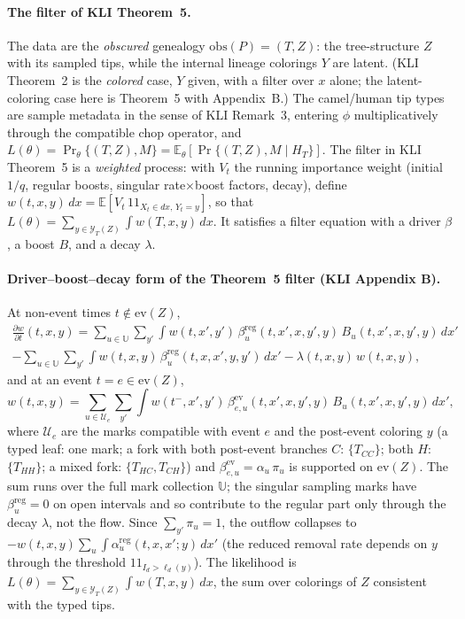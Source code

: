 \documentclass[11pt]{article}
\newcommand{\E}{\mathbb{E}}
\newcommand{\evZ}{\mathrm{ev}(Z)}
\newcommand{\ind}{1\!\!1}
\theoremstyle{plain}
\begin{document}
\paragraph{The filter of KLI Theorem~5.} The data are the \emph{obscured} genealogy
$\mathrm{obs}(P)=(T,Z)$: the tree-structure $Z$ with its sampled tips, while the internal lineage
colorings $Y$ are latent. (KLI Theorem~2 is the \emph{colored} case, $Y$ given, with a filter over
$x$ alone; the latent-coloring case here is Theorem~5 with Appendix~B.) The camel/human tip types
are sample metadata in the sense of KLI Remark~3, entering $\phi$ multiplicatively through the
compatible chop operator, and $L(\theta)=\Pr_\theta\{(T,Z),M\}=\E_\theta[\Pr\{(T,Z),M\mid H_T\}]$. The filter in KLI Theorem~5 is a \emph{weighted} process: with $V_t$ the running importance weight (initial $1/q$, regular
boosts, singular rate$\times$boost factors, decay), define
$w(t,x,y)\,dx=\E\!\left[V_t\,\ind_{X_t\in dx,\,Y_t=y}\right]$, so that
$L(\theta)=\sum_{y\in\mathcal Y_T(Z)}\int w(T,x,y)\,dx$. It satisfies a filter
equation with a driver $\beta$, a boost $B$, and a decay $\lambda$.

\paragraph{Driver--boost--decay form of the Theorem~5 filter (KLI Appendix B).}
At non-event times $t\notin\evZ$,
\begin{multline*}
\frac{\partial w}{\partial t}(t,x,y)=\sum_{u\in\mathbb U}\sum_{y'}\int w(t,x',y')\,\beta^{\mathrm{reg}}_u(t,x',x,y',y)\,B_u(t,x',x,y',y)\,dx'\\
-\sum_{u\in\mathbb U}\sum_{y'}\int w(t,x,y)\,\beta^{\mathrm{reg}}_u(t,x,x',y,y')\,dx'-\lambda(t,x,y)\,w(t,x,y),
\end{multline*}
and at an event $t=e\in\evZ$,
\[
w(t,x,y)=\sum_{u\in\mathcal U_e}\sum_{y'}\int w(t^-,x',y')\,\beta^{\mathrm{ev}}_{e,u}(t,x',x,y',y)\,B_u(t,x',x,y',y)\,dx',
\]
where $\mathcal U_e$ are the marks compatible with event $e$ and the post-event coloring $y$ (a typed
leaf: one mark; a fork with both post-event branches $C$: $\{T_{CC}\}$; both $H$: $\{T_{HH}\}$; a mixed
fork: $\{T_{HC},T_{CH}\}$) and $\beta^{\mathrm{ev}}_{e,u}=\alpha_u\,\pi_u$ is supported on $\evZ$.
The sum runs over the full mark collection $\mathbb U$; the singular sampling marks have
$\beta^{\mathrm{reg}}_u=0$ on open intervals and so contribute to the regular part only through the
decay $\lambda$, not the flow.
Since $\sum_{y'}\pi_u=1$, the outflow collapses to
$-w(t,x,y)\sum_{u}\int\alpha^{\mathrm{reg}}_u(t,x,x';y)\,dx'$ (the reduced removal rate depends on $y$
through the threshold $\ind_{I_d>\ell_d(y)}$). The likelihood is
$L(\theta)=\sum_{y\in\mathcal Y_T(Z)}\int w(T,x,y)\,dx$, the sum over colorings of $Z$ consistent with
the typed tips.
\end{document}
